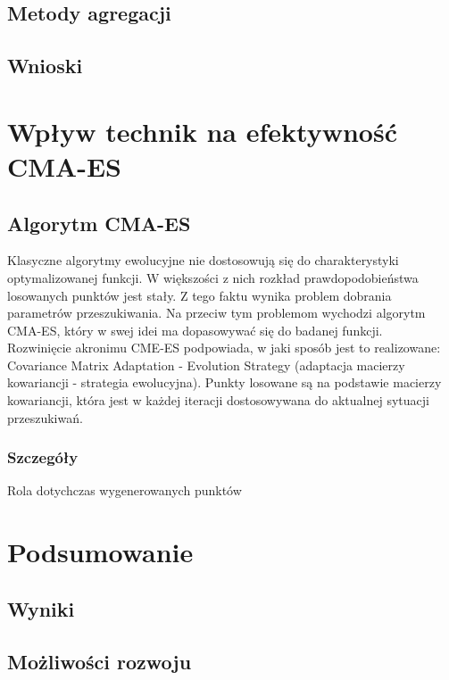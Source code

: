 \documentclass{mini}
\begin{document}
\subsection{Metody agregacji}

\subsection{Wnioski}

\pagebreak

\section{Wpływ technik na efektywność CMA-ES}

\subsection{Algorytm CMA-ES}
Klasyczne algorytmy ewolucyjne nie dostosowują się do charakterystyki optymalizowanej funkcji. W większości z nich rozkład prawdopodobieństwa losowanych punktów jest stały. Z tego faktu wynika problem dobrania parametrów przeszukiwania. Na przeciw tym problemom wychodzi algorytm CMA-ES, który w swej idei ma dopasowywać się do badanej funkcji.\\
Rozwinięcie akronimu CME-ES podpowiada, w jaki sposób jest to realizowane: Covariance Matrix Adaptation - Evolution Strategy (adaptacja macierzy kowariancji - strategia ewolucyjna). Punkty losowane są na podstawie macierzy kowariancji, która jest w każdej iteracji dostosowywana do aktualnej sytuacji przeszukiwań.

\subsubsection*{Szczegóły}
Rola dotychczas wygenerowanych punktów

\pagebreak

\section{Podsumowanie}

\subsection{Wyniki}

\subsection{Możliwości rozwoju}

\pagebreak

\begin{thebibliography}{9}

\end{thebibliography}

\makestatement
\end{document}
